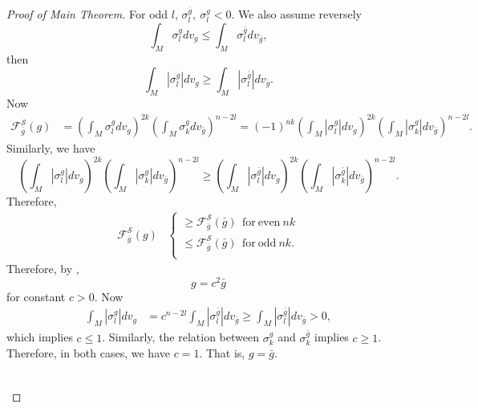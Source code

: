 \documentclass[12pt]{amsart}
\newcommand{\bg}{\bar{g}}
\numberwithin{equation}{section}
\begin{document}
\begin{proof}[Proof of Main Theorem]
    For odd $l$, $\sigma_l^{\bg},\ \sigma_l^g<0$. We also assume reversely
    \begin{equation*}
        \int_M\sigma_l^gdv_g\leq\int_M\sigma_l^{\bg}dv_{\bg},
    \end{equation*}
    then    
    \begin{equation*}
        \int_M|\sigma_l^g|dv_g\geq\int_M|\sigma_l^{\bg}|dv_{\bg}.
    \end{equation*}
    Now
    \begin{align*}
        \mathcal{F}_{\bg}^{\mathcal{S}}(g)&=\left(\int_M\sigma_l^gdv_g\right)^{2k}\left(\int_M\sigma_k^gdv_{\bg}\right)^{n-2l} =(-1)^{nk}\left(\int_M|\sigma_l^g|dv_g\right)^{2k}\left(\int_M|\sigma_k^g|dv_{\bg}\right)^{n-2l}.
    \end{align*}
    Similarly, we have 
    \begin{equation*}
        \left(\int_M|\sigma_l^g|dv_g\right)^{2k}\left(\int_M|\sigma_k^g|dv_{\bg}\right)^{n-2l}\geq\left(\int_M|\sigma_l^{\bg}|dv_g\right)^{2k}\left(\int_M|\sigma_k^{\bg}|dv_{\bg}\right)^{n-2l}.
    \end{equation*}
    Therefore,
    \begin{align*}
    \mathcal{F}_{\bg}^{\mathcal{S}}(g)
        &\begin{cases}
            \geq\mathcal{F}_{\bg}^{\mathcal{S}}(\bg)\ \  \mathrm{for\ even}\ nk \\
            \leq\mathcal{F}_{\bg}^{\mathcal{S}}(\bg)\ \  \mathrm{for\ odd}\ nk. \\
        \end{cases}
    \end{align*}
    Therefore, by ,
    \begin{equation*}
        g=c^2\bg
    \end{equation*}
    for constant $c>0$. Now
    \begin{align*}
        \int_M|\sigma_l^g|dv_g &= c^{n-2l}\int_M|\sigma_l^{\bg}|dv_{\bg} \geq \int_M|\sigma_l^{\bg}|dv_{\bg}>0,
    \end{align*}
    which implies $c\leq1$. Similarly, the relation between $\sigma_k^g$ and $\sigma_k^{\bg}$ implies $c\geq1$. Therefore, in both cases, we have $c=1$. That is, $g=\bg$.

    \ \\


\end{proof}
\end{document}
